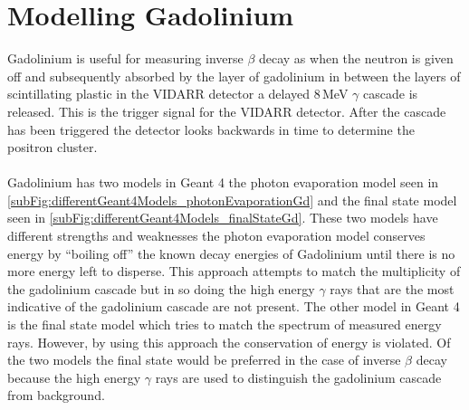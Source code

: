 \section{Modelling Gadolinium}\label{sec:geant4Simulation_modellingGadolinium}
Gadolinium is useful for measuring inverse $\beta$ decay as when the neutron is given off and subsequently absorbed by the layer of gadolinium in between the layers of scintillating plastic in the VIDARR detector a delayed 8\,MeV $\gamma$ cascade is released. This is the trigger signal for the VIDARR detector. After the cascade has been triggered the detector looks backwards in time to determine the positron cluster. 
\\\\Gadolinium has two models in Geant 4 the photon evaporation model seen in \ref{subFig:differentGeant4Models_photonEvaporationGd} and the final state model seen in  \ref{subFig:differentGeant4Models_finalStateGd}. These two models have different strengths and weaknesses the photon evaporation model conserves energy by ``boiling off'' the known decay energies of Gadolinium until there is no more energy left to disperse. This approach attempts to match the multiplicity of the gadolinium cascade but in so doing the high energy $\gamma$ rays that are the most indicative of the gadolinium cascade are not present. The other model in Geant 4 is the final state model which tries to match the spectrum of measured energy rays. However, by using this approach the conservation of energy is violated. Of the two models the final state would be preferred in the case of inverse $\beta$ decay because the high energy $\gamma$ rays are used to distinguish the gadolinium cascade from background.

